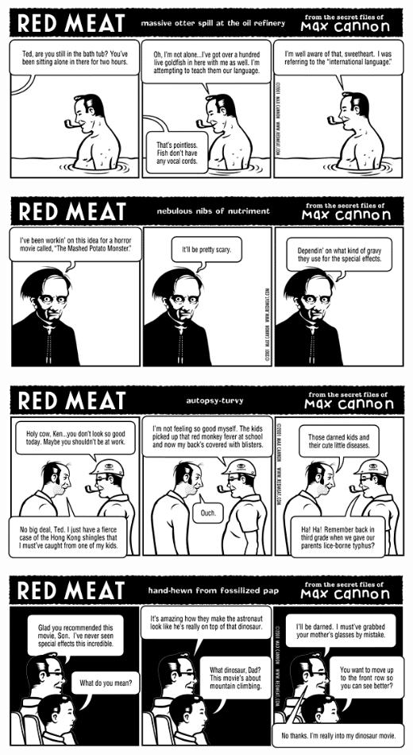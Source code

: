 \documentclass[a4paper,twoside,11pt]{article}
\begin{document}
\includegraphics[width=\textwidth]{redmeat_2001-10-30.png}



\includegraphics[width=\textwidth]{redmeat_2001-11-06.png}



\includegraphics[width=\textwidth]{redmeat_2001-11-13.png}



\includegraphics[width=\textwidth]{redmeat_2001-11-20.png}
\end{document}
